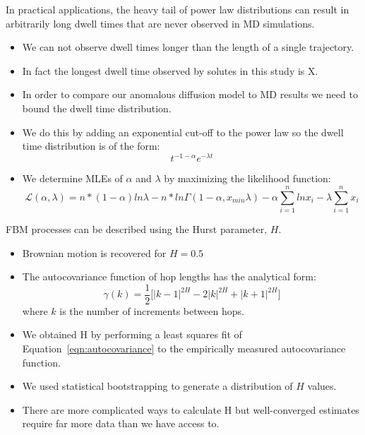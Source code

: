 \documentclass{article}
\begin{document}
  In practical applications, the heavy tail of power law distributions can result in 
  arbitrarily long dwell times that are never observed in MD simulations. 
  \begin{itemize}
    \item We can not observe dwell times longer than the length of a single trajectory.
    \item In fact the longest dwell time observed by solutes in this study is X.
    \item In order to compare our anomalous diffusion model to MD results we need to 
    bound the dwell time distribution.
    \item We do this by adding an exponential cut-off to the power law so the dwell 
    time distribution is of the form:
    \begin{equation}
    t^{-1 - \alpha}e^{-\lambda t}
    \end{equation}
    \item We determine MLEs of $\alpha$ and $\lambda$ by maximizing the likelihood function:~\cite{clauset_power-law_2009}
    \begin{equation}
    \mathcal{L}(\alpha, \lambda) = n*(1 - \alpha)ln\lambda - n*ln\Gamma(1 - \alpha, x_{min}\lambda) - \alpha\sum_{i=1}^{n}ln x_i - \lambda\sum_{i=1}^n x_i
    \end{equation}
  \end{itemize}
  
  \noindent FBM processes can be described using the Hurst parameter, $H$.
  \begin{itemize}
  	\item Brownian motion is recovered for $H = 0.5$
	\item The autocovariance function of hop lengths has the analytical form:~\cite{mandelbrot_fractional_1968}
    \begin{equation}
	\gamma(k) = \dfrac{1}{2}\bigg[|k-1|^{2H} - 2|k|^{2H} + |k+1|^{2H}\bigg]
	\label{eqn:autocovariance}
	\end{equation}
	where $k$ is the number of increments between hops.
	\item We obtained H by performing a least squares fit of Equation~\ref{eqn:autocovariance}
	to the empirically measured autocovariance function.
	\item We used statistical bootstrapping to generate a distribution of $H$ 
	values. %
	\item There are more complicated ways to calculate H but well-converged estimates 
	require far more data than we have access to.
  \end{itemize}
  
\end{document}
